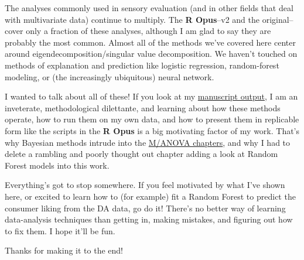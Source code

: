 \documentclass[
]{book}
\begin{document}
The analyses commonly used in sensory evaluation (and in other fields that deal with multivariate data) continue to multiply. The \textbf{R Opus}--v2 and the original--cover only a fraction of these analyses, although I am glad to say they are probably the most common. Almost all of the methods we've covered here center around eigendecomposition/singular value decomposition. We haven't touched on methods of explanation and prediction like logistic regression, random-forest modeling, or (the increasingly ubiquitous) neural network.

I wanted to talk about all of these! If you look at my \href{https://scholar.google.com/citations?user=f-3bd00AAAAJ&hl=en}{manuscript output}, I am an inveterate, methodological dilettante, and learning about how these methods operate, how to run them on my own data, and how to present them in replicable form like the scripts in the \textbf{R Opus} is a big motivating factor of my work. That's why Bayesian methods intrude into the \hyperref[analysis-of-variance]{M/ANOVA chapters}, and why I had to delete a rambling and poorly thought out chapter adding a look at Random Forest models into this work.

Everything's got to stop somewhere. If you feel motivated by what I've shown here, or excited to learn how to (for example) fit a Random Forest to predict the consumer liking from the DA data, go do it! There's no better way of learning data-analysis techniques than getting in, making mistakes, and figuring out how to fix them. I hope it'll be fun.

Thanks for making it to the end!

  
\end{document}
